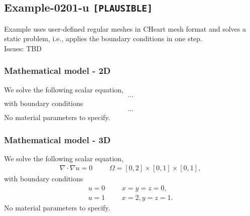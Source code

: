%
\clearpage
%
\subsection{Example-0201-u \texttt{[PLAUSIBLE]}}
%
Example uses user-defined regular meshes in CHeart mesh format
and solves a static problem, i.e., applies the boundary conditions in one step.\\[3ex]

Issues: TBD
%
%
\subsubsection{Mathematical model - 2D}
%
We solve the following scalar equation,
%
\begin{align}
    ...
\end{align}
%
with boundary conditions
%
\begin{align}
    ...
\end{align}
%
No material parameters to specify.
%
%
\subsubsection{Mathematical model - 3D}
%
We solve the following scalar equation,
%
\begin{align}
    \nabla \cdot \nabla u = 0 & &&\Omega = [0, 2] \times [0, 1] \times [0, 1],
\end{align}
%
with boundary conditions
%
\begin{align}
    u = 0 & &&x = y = z = 0, \\
    u = 1 & &&x = 2, y = z = 1.
\end{align}
%
No material parameters to specify.
%
%
